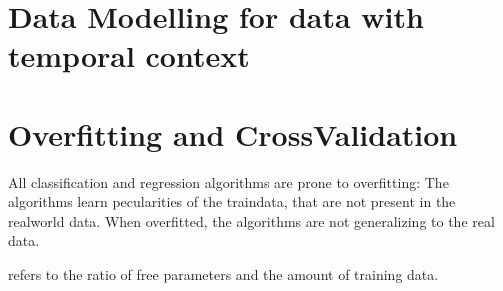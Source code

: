 \documentclass[letterpaper,10pt,english]{jupyterBook}
\begin{document}
\chapter{Data Modelling for data with temporal context}
\label{\detokenize{dependent_data:data-modelling-for-data-with-temporal-context}}\label{\detokenize{dependent_data::doc}}
\sphinxAtStartPar
{}

\sphinxAtStartPar
{}


\chapter{Overfitting and Cross\sphinxhyphen{}Validation}
\label{\detokenize{dependent_data:overfitting-and-cross-validation}}
\sphinxAtStartPar
All classification and regression algorithms are prone to overfitting:
The algorithms learn pecularities of the train\sphinxhyphen{}data, that are not present in the real\sphinxhyphen{}world data.
When over\sphinxhyphen{}fitted, the algorithms are not generalizing to the real data.

\sphinxAtStartPar
{} refers to the ratio of free parameters and the amount of training data.

\noindent{}
\end{document}
